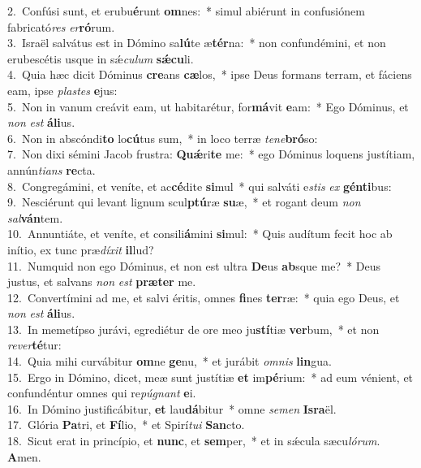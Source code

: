 {2.~}Confúsi sunt, et erubu\textbf{é}runt \textbf{om}nes:~* simul abiérunt in confusiónem fabricató\textit{res} \textit{er}\textbf{ró}rum.\\
{3.~}Israël salvátus est in Dómino sa\textbf{lú}te æ\textbf{tér}na:~* non confundémini, et non erubescétis usque in sǽ\textit{cu}\textit{lum} \textbf{sǽ}\textbf{cu}li.\\
{4.~}Quia hæc dicit Dóminus \textbf{cre}ans \textbf{cæ}los,~* ipse Deus formans terram, et fáciens eam, ipse \textit{pla}\textit{stes} \textbf{e}jus:\\
{5.~}Non in vanum creávit eam, ut habitarétur, for\textbf{má}vit \textbf{e}am:~* Ego Dóminus, et \textit{non} \textit{est} \textbf{á}\textbf{li}us.\\
{6.~}Non in abscóndi\textbf{to} lo\textbf{cú}tus sum,~* in loco terræ \textit{te}\textit{ne}\textbf{bró}so:\\
{7.~}Non dixi sémini Jacob frustra: \textbf{Quǽ}ri\textbf{te} me:~* ego Dóminus loquens justítiam, annún\textit{ti}\textit{ans} \textbf{re}cta.\\
{8.~}Congregámini, et veníte, et ac\textbf{cé}dite \textbf{si}mul~* qui salváti e\textit{stis} \textit{ex} \textbf{gén}\textbf{ti}bus:\\
{9.~}Nesciérunt qui levant lignum scul\textbf{ptú}ræ \textbf{su}æ,~* et rogant deum \textit{non} \textit{sal}\textbf{ván}tem.\\
{10.~}Annuntiáte, et veníte, et consili\textbf{á}mini \textbf{si}mul:~* Quis audítum fecit hoc ab inítio, ex tunc præ\textit{dí}\textit{xit} \textbf{il}lud?\\
{11.~}Numquid non ego Dóminus, et non est ultra \textbf{De}us \textbf{ab}sque me?~* Deus justus, et salvans \textit{non} \textit{est} \textbf{præ}\textbf{ter} me.\\
{12.~}Convertímini ad me, et salvi éritis, omnes \textbf{fi}nes \textbf{ter}ræ:~* quia ego Deus, et \textit{non} \textit{est} \textbf{á}\textbf{li}us.\\
{13.~}In memetípso jurávi, egrediétur de ore meo ju\textbf{stí}tiæ \textbf{ver}bum,~* et non \textit{re}\textit{ver}\textbf{té}tur:\\
{14.~}Quia mihi curvábitur \textbf{om}ne \textbf{ge}nu,~* et jurábit \textit{om}\textit{nis} \textbf{lin}gua.\\
{15.~}Ergo in Dómino, dicet, meæ sunt justítiæ \textbf{et} im\textbf{pé}rium:~* ad eum vénient, et confundéntur omnes qui re\textit{pú}\textit{gnant} \textbf{e}i.\\
{16.~}In Dómino justificábitur, \textbf{et} lau\textbf{dá}bitur~* omne \textit{se}\textit{men} \textbf{Is}\textbf{ra}ël.\\
{17.~}Glória \textbf{Pa}tri, et \textbf{Fí}lio,~* et Spirí\textit{tu}\textit{i} \textbf{San}cto.\\
{18.~}Sicut erat in princípio, et \textbf{nunc}, et \textbf{sem}per,~* et in sǽcula sæcu\textit{ló}\textit{rum}. \textbf{A}men.\\
